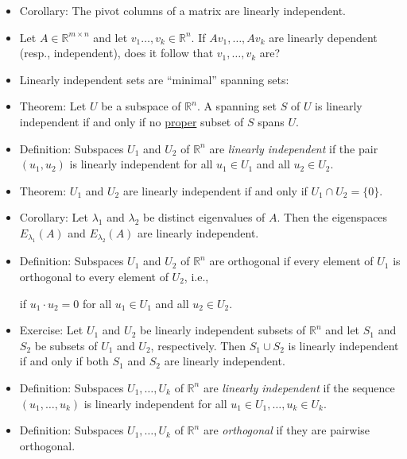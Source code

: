 \documentclass{amsart}
\newcommand{\RR}{\mathbb{R}}
\begin{document}
\begin{itemize}
  \item Corollary: The pivot columns of a matrix are linearly independent.

  \item Let $A\in\RR^{m\times n}$ and let $v_1\ldots,v_k\in \RR^n$.
  If $Av_1,\ldots,Av_k$ are linearly dependent (resp., independent), does it follow that $v_1,\ldots,v_k$ are?

  \item Linearly independent sets are ``minimal'' spanning sets:

  \item Theorem: Let $U$ be a subspace of $\RR^n$. A spanning set $S$ of $U$ is linearly independent if and only if no \underline{proper} subset of $S$ spans $U$.

  \item Definition: Subspaces $U_1$ and $U_2$ of $\RR^n$ are \emph{linearly independent} if the pair $(u_1, u_2)$ is linearly independent for all $u_1\in U_1$ and all $u_2\in U_2$. 

  \item Theorem: $U_1$ and $U_2$ are linearly independent if and only if $U_1\cap U_2 = \{0\}$.

  \item Corollary: Let $\lambda_1$ and $\lambda_2$ be distinct eigenvalues of $A$. Then the eigenspaces $E_{\lambda_1}(A)$ and $E_{\lambda_2}(A)$ are linearly independent.

  \item Definition: Subspaces $U_1$ and $U_2$ of $\RR^n$ are orthogonal if every element of $U_1$ is orthogonal to every element of $U_2$, i.e.,
  \begin{center}
    if $u_1\cdot u_2=0$ for all $u_1\in U_1$ and all $u_2\in U_2$.
  \end{center}
  \item Exercise: Let $U_1$ and $U_2$ be linearly independent subsets of $\RR^n$ and let $S_1$ and $S_2$ be subsets of $U_1$ and $U_2$, respectively. Then $S_1\cup S_2$ is linearly independent if and only if both $S_1$ and $S_2$ are linearly independent.

  \item Definition: Subspaces $U_1,\ldots,U_k$ of $\RR^n$ are \emph{linearly independent} if the sequence $(u_1,\ldots, u_k)$ is linearly independent for all $u_1\in U_1,\ldots,u_k\in U_k$. 

  \item Definition:  Subspaces $U_1,\ldots,U_k$ of $\RR^n$ are \emph{orthogonal} if they are pairwise orthogonal. 


\end{itemize}
\end{document}
